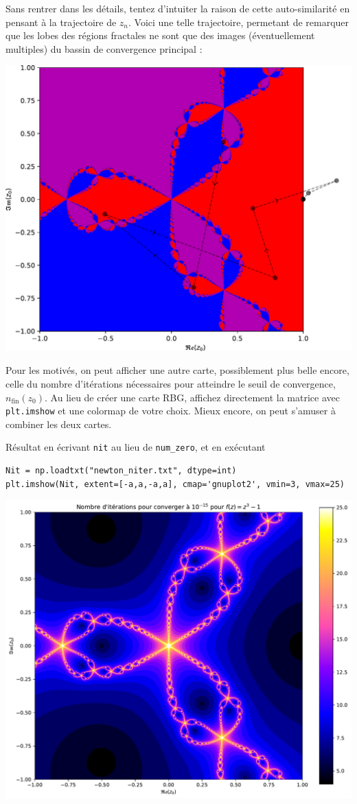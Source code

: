 \documentclass{book}
\newcommand{\inline}[1]{\texttt{#1}}
\begin{document}
\begin{correction}
Sans rentrer dans les détails, tentez d'intuiter la raison de cette auto-similarité en pensant à la trajectoire de $z_n$. Voici une telle trajectoire, permetant de remarquer que les lobes des régions fractales ne sont que des images (éventuellement multiples) du bassin de convergence principal :
\begin{center}
\includegraphics[width=0.7\linewidth]{TD2/newton_bassins_converg.a1_and_traj.pdf}
\end{center}
\end{correction}

Pour les motivés, on peut afficher une autre carte, possiblement plus belle encore, celle du nombre d'itérations nécessaires pour atteindre le seuil de convergence, $n_\text{fin}(z_0)$. Au lieu de créer une carte RBG, affichez directement la matrice avec \inline{plt.imshow} et une colormap de votre choix. Mieux encore, on peut s'amuser à combiner les deux cartes.

\begin{correction}
Résultat en écrivant \inline{nit} au lieu de \inline{num_zero}, et en exécutant
\begin{verbatim}
Nit = np.loadtxt("newton_niter.txt", dtype=int)
plt.imshow(Nit, extent=[-a,a,-a,a], cmap='gnuplot2', vmin=3, vmax=25)
\end{verbatim}
\includegraphics[width=0.95\linewidth]{TD2/newton_newton_niter.a1.pdf}
\end{correction}
\end{document}
